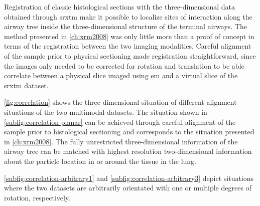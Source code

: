 Registration of classic histological sections with the three-dimensional data obtained through \ac{srxtm} make it possible to localize sites of interaction along the airway tree inside the three-dimensional structure of the terminal airways. The method presented in \autoref{ch:xrm2008} was only little more than a proof of concept in terms of the registration between the two imaging modalities. Careful alignment of the sample prior to physical sectioning made registration straightforward, since the images only needed to be corrected for rotation and translation to be able correlate between a physical slice imaged using \ac{em} and a virtual slice of the \ac{srxtm} dataset.

\autoref{fig:correlation} shows the three-dimensional situation of different alignment situations of the two multimodal datasets. The situation shown in \autoref{subfig:correlation-planar} can be achieved through careful alignment of the sample prior to histological sectioning and corresponds to the situation presented in \autoref{ch:xrm2008}. The fully unrestricted three-dimensional information of the airway tree can be matched with highest resolution two-dimensional information about the particle location in or around the tissue in the lung.

\autoref{subfig:correlation-arbitrary1} and \ref{subfig:correlation-arbitrary3} depict situations where the two datasets are arbitrarily orientated with one or multiple degrees of rotation, respectively.

